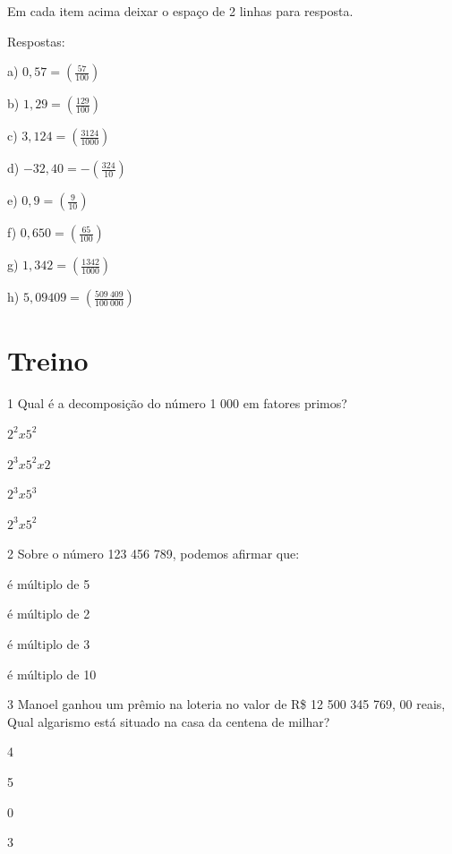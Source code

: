 Em cada item acima deixar o espaço de 2 linhas para resposta.

Respostas:

a) $0,57 = (\frac{57}{100})$

b) $1,29 = (\frac{129}{100})$

c) $3,124 = (\frac{3124}{1000})$

d) $-32,40 = -(\frac{324}{10})$

e) $0,9 = (\frac{9}{10})$

f) $0,650 = (\frac{65}{100})$

g) $1,342 = (\frac{1342}{1000})$

h) $5,09409 = (\frac{509\ 409}{100\ 000})$

\section{Treino}

\num{1} Qual é a decomposição do número 1 000 em fatores primos?

\begin{escolha} 
\item
 $2^2 x 5^2$
\item
 $2^3 x 5^2 x 2$
\item
 $2^3 x 5^3$ 
\item
 $2^3x5^2$
\end{escolha}

\num{2} Sobre o número 123 456 789, podemos afirmar que:

\begin{escolha}
\item é múltiplo de 5
\item é múltiplo de 2
\item é múltiplo de 3
\item é múltiplo de 10
\end{escolha}


\num{3} Manoel ganhou um prêmio na loteria no valor de R\$ 12 500 345 769, 00
reais, Qual algarismo está situado na casa da centena de milhar?

\begin{escolha}

\item 4
\item 5
\item 0
\item 3

\end{escolha}


